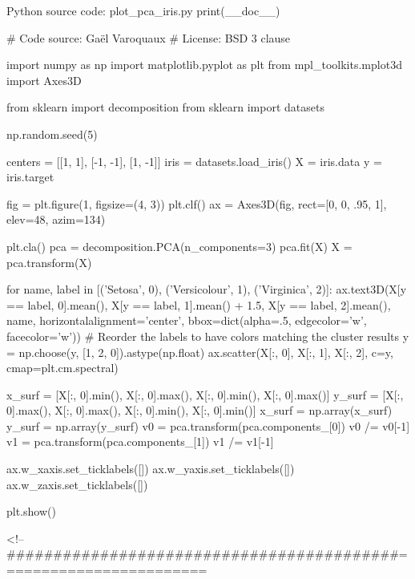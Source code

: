 Python source code: plot_pca_iris.py
print(__doc__)


# Code source: Gaël Varoquaux
# License: BSD 3 clause

import numpy as np
import matplotlib.pyplot as plt
from mpl_toolkits.mplot3d import Axes3D


from sklearn import decomposition
from sklearn import datasets

np.random.seed(5)

centers = [[1, 1], [-1, -1], [1, -1]]
iris = datasets.load_iris()
X = iris.data
y = iris.target

fig = plt.figure(1, figsize=(4, 3))
plt.clf()
ax = Axes3D(fig, rect=[0, 0, .95, 1], elev=48, azim=134)

plt.cla()
pca = decomposition.PCA(n_components=3)
pca.fit(X)
X = pca.transform(X)

for name, label in [('Setosa', 0), ('Versicolour', 1), ('Virginica', 2)]:
ax.text3D(X[y == label, 0].mean(),
X[y == label, 1].mean() + 1.5,
X[y == label, 2].mean(), name,
horizontalalignment='center',
bbox=dict(alpha=.5, edgecolor='w', facecolor='w'))
# Reorder the labels to have colors matching the cluster results
y = np.choose(y, [1, 2, 0]).astype(np.float)
ax.scatter(X[:, 0], X[:, 1], X[:, 2], c=y, cmap=plt.cm.spectral)

x_surf = [X[:, 0].min(), X[:, 0].max(),
X[:, 0].min(), X[:, 0].max()]
y_surf = [X[:, 0].max(), X[:, 0].max(),
X[:, 0].min(), X[:, 0].min()]
x_surf = np.array(x_surf)
y_surf = np.array(y_surf)
v0 = pca.transform(pca.components_[0])
v0 /= v0[-1]
v1 = pca.transform(pca.components_[1])
v1 /= v1[-1]

ax.w_xaxis.set_ticklabels([])
ax.w_yaxis.set_ticklabels([])
ax.w_zaxis.set_ticklabels([])

plt.show()

<!-- ##########################################======================== %

